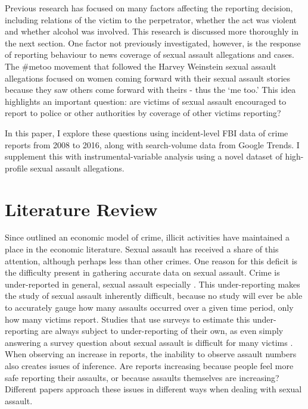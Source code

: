\documentclass[AER,draftmode]{AEA}
\begin{document}
Previous research has focused on many factors affecting the reporting decision, including relations of the victim to the perpetrator, whether the act was violent and whether alcohol was involved. This research is discussed more thoroughly in the next section. One factor not previously investigated, however, is the response of reporting behaviour to news coverage of sexual assault allegations and cases. The \#metoo movement that followed the Harvey Weinstein sexual assault allegations  focused on women coming forward with their sexual assault stories because they saw others come forward with theirs - thus the `me too.' This idea highlights an important question: are victims of sexual assault encouraged to report to police or other authorities by coverage of other victims reporting?

In this paper, I explore these questions using incident-level FBI data of crime reports from 2008 to 2016, along with search-volume data from Google Trends. I supplement this  with instrumental-variable analysis using a novel dataset of high-profile sexual assault allegations. 

\section{Literature Review}

Since  outlined an economic model of crime, illicit activities have maintained a place in the economic literature. Sexual assault has received a share of this attention, although perhaps less than other crimes. One reason for this deficit is the difficulty present in gathering accurate data on sexual assault. Crime is under-reported in general, sexual assault especially \cite{fisher_sexual_2000}. This under-reporting makes the study of sexual assault inherently difficult, because no study will ever be able to accurately gauge how many assaults occurred over a given time period, only how many victims report. Studies that use surveys to estimate this under-reporting are always subject to under-reporting of their own, as even simply answering a survey question about sexual assault is difficult for many victims \cite{du_mont_role_2003}. When observing an increase in reports, the inability to observe assault numbers also creates issues of inference. Are reports increasing because people feel more safe reporting their assaults, or because assaults themselves are increasing? Different papers approach these issues in different ways when dealing with sexual assault.
\end{document}
